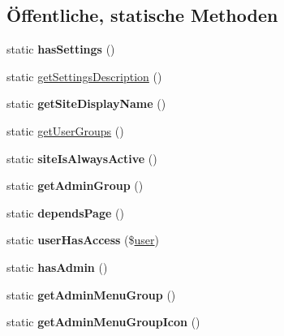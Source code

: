 \subsection*{Öffentliche, statische Methoden}
\begin{DoxyCompactItemize}
\item 
\mbox{\label{classabsenzenlehrer_a317d41f76420dfd44440e76c28de211a}} 
static {\bfseries has\+Settings} ()
\item 
static \mbox{\hyperlink{classabsenzenlehrer_a1dbf2ba5acfa095b712acd3c88fe84fe}{get\+Settings\+Description}} ()
\item 
\mbox{\label{classabsenzenlehrer_a7c5a844738cf983a9ad342fdc4a2b872}} 
static {\bfseries get\+Site\+Display\+Name} ()
\item 
static \mbox{\hyperlink{classabsenzenlehrer_a75636b34c0b7caf02ab00a279993fd66}{get\+User\+Groups}} ()
\item 
\mbox{\label{classabsenzenlehrer_aca006c8fa70913f9495c5b417d6dcadf}} 
static {\bfseries site\+Is\+Always\+Active} ()
\item 
\mbox{\label{classabsenzenlehrer_a0c1782e66c0dd573286bc08893fb0a06}} 
static {\bfseries get\+Admin\+Group} ()
\item 
\mbox{\label{classabsenzenlehrer_a472df0d3c1108fd62476a1a4ff65b15a}} 
static {\bfseries depends\+Page} ()
\item 
\mbox{\label{classabsenzenlehrer_aa806a21ee27abf85519255c3a5834d3d}} 
static {\bfseries user\+Has\+Access} (\$\mbox{\hyperlink{classuser}{user}})
\item 
\mbox{\label{classabsenzenlehrer_a51aa519c50ff3685c2a25547b9e420f8}} 
static {\bfseries has\+Admin} ()
\item 
\mbox{\label{classabsenzenlehrer_a7bda30032c686853becd6afe8d45ea14}} 
static {\bfseries get\+Admin\+Menu\+Group} ()
\item 
\mbox{\label{classabsenzenlehrer_ab5bf687a9b3e89195cebedb3533432d0}} 
static {\bfseries get\+Admin\+Menu\+Group\+Icon} ()
\end{DoxyCompactItemize}
